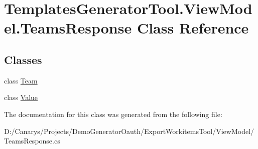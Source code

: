 \hypertarget{class_templates_generator_tool_1_1_view_model_1_1_teams_response}{}\section{Templates\+Generator\+Tool.\+View\+Model.\+Teams\+Response Class Reference}
\label{class_templates_generator_tool_1_1_view_model_1_1_teams_response}
\subsection*{Classes}
\begin{DoxyCompactItemize}
\item 
class \mbox{\hyperlink{class_templates_generator_tool_1_1_view_model_1_1_teams_response_1_1_team}{Team}}
\item 
class \mbox{\hyperlink{class_templates_generator_tool_1_1_view_model_1_1_teams_response_1_1_value}{Value}}
\end{DoxyCompactItemize}


The documentation for this class was generated from the following file\+:\begin{DoxyCompactItemize}
\item 
D\+:/\+Canarys/\+Projects/\+Demo\+Generator\+Oauth/\+Export\+Workitems\+Tool/\+View\+Model/Teams\+Response.\+cs\end{DoxyCompactItemize}
